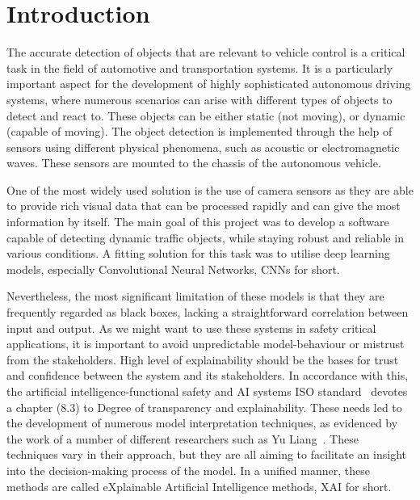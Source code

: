 
\section{Introduction}\label{sec:introduction}

The accurate detection of objects that are relevant to vehicle control is a critical task in the field of automotive and transportation systems.
It is a particularly important aspect for the development of highly sophisticated autonomous driving systems, where numerous scenarios can arise with different types of objects to detect and react to.
These objects can be either static (not moving), or dynamic (capable of moving).
The object detection is implemented through the help of sensors using different physical phenomena, such as acoustic or electromagnetic waves.
These sensors are mounted to the chassis of the autonomous vehicle.

One of the most widely used solution is the use of camera sensors as they are able to
provide rich visual data that can be processed rapidly and can give the most information by itself.
The main goal of this project was to develop a software capable of detecting dynamic traffic
objects, while staying robust and reliable in various conditions.
A fitting solution for this task was to utilise deep learning models, especially Convolutional Neural Networks, CNNs for short.

Nevertheless, the most significant limitation of these models is that they are frequently regarded as black boxes, lacking a straightforward correlation between input and output.
As we might want to use these systems in safety critical applications,
it is important to avoid unpredictable model-behaviour or mistrust from the stakeholders.
High level of explainability should be the bases for trust and confidence between the system and its stakeholders.
In accordance with this, the artificial intelligence-functional safety and AI systems ISO standard~\cite{ISO5469:2021} devotes a chapter (8.3) to
Degree of transparency and explainability.
These needs led to the development of numerous model interpretation techniques,
as evidenced by the work of a number of different researchers such as Yu Liang~\cite{LIANG2021168}.
These techniques vary in their approach, but they are all aiming to facilitate an insight into the decision-making process of the model.
In a unified manner, these methods are called eXplainable Artificial Intelligence methods, XAI for short.


